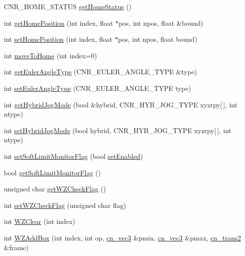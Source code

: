 \begin{DoxyCompactItemize}
C\-N\-R\-\_\-\-H\-O\-M\-E\-\_\-\-S\-T\-A\-T\-U\-S \hyperlink{classCUIApp_a2151edd77746c8862cc46f02319b0274}{get\-Home\-Status} ()
\item 
int \hyperlink{classCUIApp_a478a122cd1d492055b063a6836a33212}{get\-Home\-Position} (int index, float $\ast$pos, int npos, float \&bound)
\item 
int \hyperlink{classCUIApp_ab3595ed37eb43bb0c552623806e90249}{set\-Home\-Position} (int index, float $\ast$pos, int npos, float bound)
\item 
int \hyperlink{classCUIApp_ae4246ee91a5f098604d03d8459f1b634}{move\-To\-Home} (int index=0)
\item 
int \hyperlink{classCUIApp_a392d9f88563aa020c997f11a829dc909}{get\-Euler\-Angle\-Type} (C\-N\-R\-\_\-\-E\-U\-L\-E\-R\-\_\-\-A\-N\-G\-L\-E\-\_\-\-T\-Y\-P\-E \&type)
\item 
int \hyperlink{classCUIApp_a18eca8206aa0eedab39af17c3e55c511}{set\-Euler\-Angle\-Type} (C\-N\-R\-\_\-\-E\-U\-L\-E\-R\-\_\-\-A\-N\-G\-L\-E\-\_\-\-T\-Y\-P\-E type)
\item 
int \hyperlink{classCUIApp_aec69bd13266bc0bb999b2f3d28bc17b3}{get\-Hybrid\-Jog\-Mode} (bool \&hybrid, C\-N\-R\-\_\-\-H\-Y\-B\-\_\-\-J\-O\-G\-\_\-\-T\-Y\-P\-E xyzrpy\mbox{[}$\,$\mbox{]}, int ntype)
\item 
int \hyperlink{classCUIApp_a4d5e32f869d8cd37f595ac0581c548c0}{set\-Hybrid\-Jog\-Mode} (bool hybrid, C\-N\-R\-\_\-\-H\-Y\-B\-\_\-\-J\-O\-G\-\_\-\-T\-Y\-P\-E xyzrpy\mbox{[}$\,$\mbox{]}, int ntype)
\item 
int \hyperlink{classCUIApp_af643f6bcefda4737060fb9225a304ed8}{set\-Soft\-Limit\-Monitor\-Flag} (bool \hyperlink{classCUIApp_a0bb9aaecc950f991d3ecc69e5895e9e6}{set\-Enabled})
\item 
bool \hyperlink{classCUIApp_a87e000f4f97ea7f78c3e40cb2ed305cd}{get\-Soft\-Limit\-Monitor\-Flag} ()
\item 
unsigned char \hyperlink{classCUIApp_a339658f6d6002aa770b0a0a416653904}{get\-W\-Z\-Check\-Flag} ()
\item 
int \hyperlink{classCUIApp_a186fff0fa0564e376726df78bf31802f}{set\-W\-Z\-Check\-Flag} (unsigned char flag)
\item 
int \hyperlink{classCUIApp_ab5c2ed7bd5bacb715485e286e3d9e33e}{W\-Z\-Clear} (int index)
\item 
int \hyperlink{classCUIApp_a7ae08ed44f496fe5a3eeb0ec2c828fdb}{W\-Z\-Add\-Box} (int index, int op, \hyperlink{structcn__vec3}{cn\-\_\-vec3} \&pmin, \hyperlink{structcn__vec3}{cn\-\_\-vec3} \&pmax, \hyperlink{structcn__trans2}{cn\-\_\-trans2} \&frame)

\end{DoxyCompactItemize}
